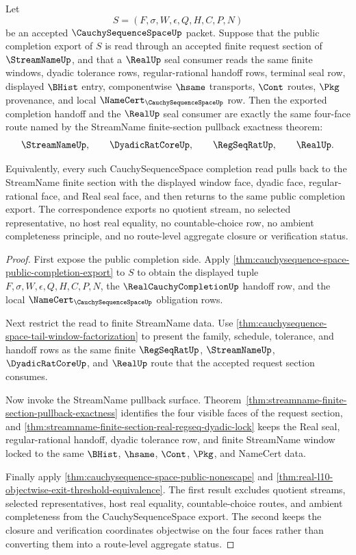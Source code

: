 \begin{theorem}
\label{thm:cauchysequence-space-finite-section-pullback-correspondence}
Let
$$
S=(F,\sigma,W,\epsilon,Q,H,C,P,N)
$$
be an accepted $\CauchySequenceSpaceUp$ packet. Suppose that the public completion export of $S$ is read through an accepted finite request section of $\StreamNameUp$, and that a $\RealUp$ seal consumer reads the same finite windows, dyadic tolerance rows, regular-rational handoff rows, terminal seal row, displayed $\BHist$ entry, componentwise $\hsame$ transports, $\Cont$ routes, $\Pkg$ provenance, and local $\NameCert_{\CauchySequenceSpaceUp}$ row. Then the exported completion handoff and the $\RealUp$ seal consumer are exactly the same four-face route named by the StreamName finite-section pullback exactness theorem:
$$
\StreamNameUp,\qquad
\DyadicRatCoreUp,\qquad
\RegSeqRatUp,\qquad
\RealUp .
$$

Equivalently, every such CauchySequenceSpace completion read pulls back to the StreamName finite section with the displayed window face, dyadic face, regular-rational face, and Real seal face, and then returns to the same public completion export. The correspondence exports no quotient stream, no selected representative, no host real equality, no countable-choice row, no ambient completeness principle, and no route-level aggregate closure or verification status.
\end{theorem}
\begin{proof}
First expose the public completion side. Apply \autoref{thm:cauchysequence-space-public-completion-export} to $S$ to obtain the displayed tuple $F,\sigma,W,\epsilon,Q,H,C,P,N$, the $\RealCauchyCompletionUp$ handoff row, and the local $\NameCert_{\CauchySequenceSpaceUp}$ obligation rows.

Next restrict the read to finite StreamName data. Use \autoref{thm:cauchysequence-space-tail-window-factorization} to present the family, schedule, tolerance, and handoff rows as the same finite $\RegSeqRatUp$, $\StreamNameUp$, $\DyadicRatCoreUp$, and $\RealUp$ route that the accepted request section consumes.

Now invoke the StreamName pullback surface. Theorem~\ref{thm:streamname-finite-section-pullback-exactness} identifies the four visible faces of the request section, and \autoref{thm:streamname-finite-section-real-regseq-dyadic-lock} keeps the Real seal, regular-rational handoff, dyadic tolerance row, and finite StreamName window locked to the same $\BHist$, $\hsame$, $\Cont$, $\Pkg$, and NameCert data.

Finally apply \autoref{thm:cauchysequence-space-public-nonescape} and \autoref{thm:real-l10-objectwise-exit-threshold-equivalence}. The first result excludes quotient streams, selected representatives, host real equality, countable-choice routes, and ambient completeness from the CauchySequenceSpace export. The second keeps the closure and verification coordinates objectwise on the four faces rather than converting them into a route-level aggregate status.
\end{proof}

